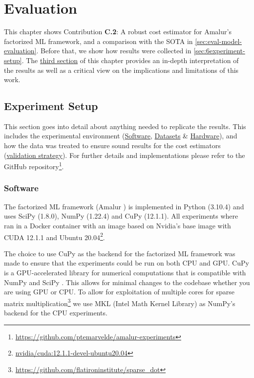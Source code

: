 
\chapter{Evaluation}
\label{chapter:evaluation-discussion}
This chapter shows Contribution \textbf{C.2}: A robust cost estimator for Amalur's factorized ML framework, and a comparison with the SOTA in \autoref{sec:eval-model-evaluation}. Before that, we show how results were collected in \autoref{sec:6experiment-setup}. The \hyperref[sec:eval-discussion]{third section} of this chapter provides an in-depth interpretation of the results as well as a critical view on the implications and limitations of this work.

\section{Experiment Setup}
\label{sec:6experiment-setup}

This section goes into detail about anything needed to replicate the results. This includes the experimental environment (\hyperref[subsec:6-software]{Software}, \hyperref[subsec:6-datasets]{Datasets} \& \hyperref[subsec:6-hardware]{Hardware}),  and how the data was treated to ensure sound results for the cost estimators (\hyperref[subsec:6-validation-strategy]{validation strategy}). For further details and implementations please refer to the GitHub repository\footnote{\url{https://github.com/ptemarvelde/amalur-experiments}}.

\subsection{Software}
\label{subsec:6-software}
The factorized ML framework (Amalur \cite{amalur}) is implemented in Python (3.10.4) and uses SciPy (1.8.0), NumPy (1.22.4) and CuPy (12.1.1). All experiments where ran in a Docker container with an image based on Nvidia's base image with CUDA 12.1.1 and Ubuntu 20.04\footnote{\href{https://hub.docker.com/layers/nvidia/cuda/12.1.1-devel-ubuntu20.04/images/sha256-5bd13c67a4479a1c13238b470d89a92937ce68ba5f21b930d50c463e3314f657?context=explore}{nvidia/cuda:12.1.1-devel-ubuntu20.04}}.

The choice to use CuPy as the backend for the factorized ML framework was made to ensure that the experiments could be run on both CPU and GPU. CuPy is a GPU-accelerated library for numerical computations that is compatible with NumPy and SciPy \cite{cupy_learningsys2017}. This allows for minimal changes to the codebase whether you are using GPU or CPU. To allow for exploitation of multiple cores for sparse matrix multiplication\footnote{\url{https://github.com/flatironinstitute/sparse_dot}} we use MKL (Intel Math Kernel Library) \cite{intel-mkl} as NumPy's backend for the CPU experiments.

